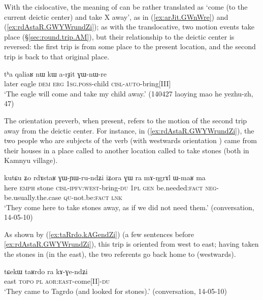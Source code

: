 With the cislocative, the meaning of  can be rather translated as `come (to the current deictic center) and take X away', as in (\ref{ex:arJit.GWnWre}) and (\ref{ex:rdAstaR.GWYWrundZi}); as with the translocative, two motion events take place (§\ref{sec:round.trip.AM}), but their relationship to the deictic center is reversed: the first trip is from some place to the present location, and the second trip is back to that original place.

\begin{exe}
\ex \label{ex:arJit.GWnWre}
\gll  tʰa qaliaʁ nɯ kɯ a-rɟit ɣɯ-nɯ-re \\
later eagle \textsc{dem} \textsc{erg} \textsc{1sg}.\textsc{poss}-child \textsc{cisl}-\textsc{auto}-bring[III] \\
\glt `The eagle will come and take my child away.' (140427 laoying mao he yezhu-zh, 47)
\end{exe}

The orientation preverb, when present, refers to the motion of the second trip away from the deictic center. For instance, in (\ref{ex:rdAstaR.GWYWrundZi}), the two people who are subjects of the verb  (with westwards orientation ) came from their houses in a place called  to another location called  to take stones (both in Kamnyu village).

\begin{exe}
\ex \label{ex:rdAstaR.GWYWrundZi}
\gll  kutɕu ʑo rdɤstaʁ ɣɯ-ɲɯ-ru-ndʑi iʑora ɣɯ ra mɤ-ŋgrɤl ɯ-maʁ ma  \\
here \textsc{emph} stone \textsc{cisl}-\textsc{ipfv}:\textsc{west}-bring-\textsc{du} \textsc{1pl} \textsc{gen} be.needed:\textsc{fact} \textsc{neg}-be.usually.the.case \textsc{qu}-not.be:\textsc{fact} \textsc{lnk} \\
\glt `They come here to take stones away, as if we did not need them.' (conversation, 14-05-10)
\end{exe}

As shown by (\ref{ex:taRrdo.kAGendZi}) (a few sentences before \ref{ex:rdAstaR.GWYWrundZi}), this trip is oriented from west to east; having taken the stones in  (in the east), the two referents go back home to  (westwards).

\begin{exe}
\ex \label{ex:taRrdo.kAGendZi}
\gll  tɕekɯ taʁrdo ra kɤ-ɣe-ndʑi \\
east  \textsc{topo} \textsc{pl} \textsc{aor}:\textsc{east}-come[II]-\textsc{du} \\
\glt `They came to Tagrdo (and looked for stones).' (conversation, 14-05-10)
\end{exe}

